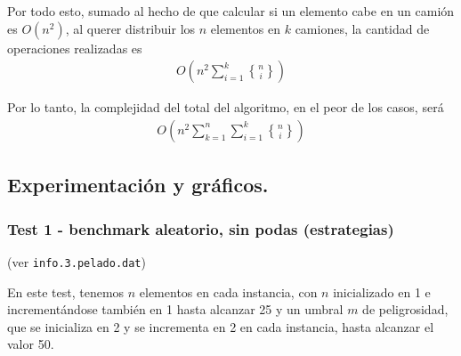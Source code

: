 Por todo esto, sumado al hecho de que calcular si un elemento cabe en un
camión es $O(n^2)$, al querer distribuir los $n$ elementos en $k$ camiones,
la cantidad de operaciones realizadas es
\begin{align*}
  O(n^2 \sum_{i=1}^k {n \brace i})
\end{align*}

Por lo tanto, la complejidad del total del algoritmo, en el peor de los
casos, será
\begin{align*}
  O(n^2 \sum_{k=1}^n \sum_{i=1}^k {n \brace i})
\end{align*}

% 
% 
% 
% 

\vspace*{0.75cm} \noindent


\newpage
\subsection{Experimentación y gráficos.}

\vspace*{0.3cm}

\subsubsection{Test 1 - benchmark aleatorio, sin podas (estrategias)}

(ver \verb|info.3.pelado.dat|) \medskip

En este test, tenemos $n$ elementos en cada instancia, con $n$ inicializado en 1 e incrementándose
también en 1 hasta alcanzar 25 y un umbral $m$ de peligrosidad, que se inicializa en 2 y se incrementa
en 2 en cada instancia, hasta alcanzar el valor 50.

